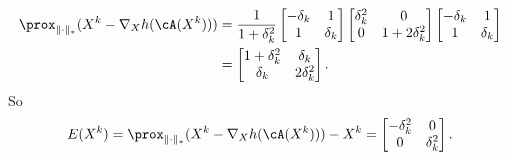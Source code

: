 \begin{equation}
\begin{split}
    \prox_{\|\cdot\|_*}(X^k-\nabla_X h(\cA(X^k)))
    &= \frac{1}{1+\delta_k^2}
    \begin{bmatrix}
        -\delta_k & 1 \\
        1  & \delta_k \\
    \end{bmatrix}
    \begin{bmatrix}
        \delta_k^2 & 0 \\
        0  & 1+2\delta_k^2 \\
    \end{bmatrix}
    \begin{bmatrix}
        -\delta_k & 1 \\
        1  & \delta_k \\
    \end{bmatrix} \\
    &=\begin{bmatrix}
        1+\delta_k^2 & \delta_k \\
        \delta_k  & 2\delta_k^2 \\
    \end{bmatrix}.
\end{split}
\end{equation}
So
\begin{equation}
    E(X^k) = \prox_{\|\cdot\|_*}(X^k-\nabla_X h(\cA(X^k))) - X^k =
    \begin{bmatrix}
        -\delta_k^2 & 0 \\
        0  & \delta_k^2 \\
    \end{bmatrix}. \\
\end{equation}
